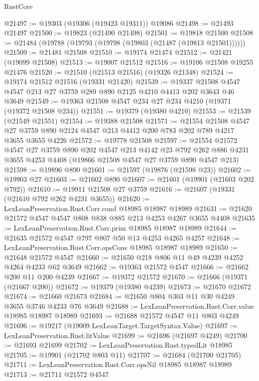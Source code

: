 \begin{lexlean}{RustCore}
\begin{coremodule}
@21497 := @19303 (@19306 (@19423 @19311)) @19086
@21498 := @21493 @21497
@21500 := @19823 (@21490 @21498)
@21501 := @19818 @21500
@21508 := @21484 (@19788 (@19793 (@19798 (@19803 (@21487 (@19813 @21501))))))
@21509 := @21481 @21508
@21510 := @19174 @21474
@21512 := @21421 (@19099 @21508)
@21513 := @19007 @21512
@21516 := @19106 @21508 @19255 @21476
@21520 := @21510 (@21513 @21516) (@19326 @21348)
@21524 := @19174 @21512 @21516 (@19331 @21420)
@21539 := @19337 @21508 @4547 @4547 @213 @27 @3759 @289 @890 @2125 @4210 @4413 @202 @3643 @46 @3649
@21549 := @19363 @21508 @4547 @234 @27 @234 @4210 (@19371 (@19372 @21508 @234))
@21551 := @19379 (@19380 @4210)
@21553 := @21539 (@21549 @21551)
@21554 := @19388 @21508
@21571 := @21554
    @21508
    @4547
    @27
    @3759
    @890
    @2124
    @4547
    @213
    @4412
    @200
    @783
    @202
    @789
    @4217
    @3655
    @3655
    @4226
@21572 := @19778 @21508
@21597 := @21554
    @21572
    @4547
    @27
    @3759
    @890
    @202
    @4547
    @213
    @4142
    @23
    @792
    @262
    @886
    @4231
    @3655
    @4253
    @4408
    (@19866 @21508 @4547 @27 @3759 @890 @4547 @213)
@21598 := @19896 @890
@21601 := @21597 (@19876 (@21598 @23))
@21602 := @19903 @27
@21603 := @21602 @890
@21607 := @21601 (@19901 (@21603 @202 @792))
@21610 := @19911 @21508 @27 @3759
@21616 := @21607 (@19331 (@21610 @792 @262 @4231 @3655))
@21620 := LexLeanPreservation.Rust.Corr.cond @18985 @18987 @18989
@21631 := @21620 @21572 @4547 @4547 @808 @838 @885 @213 @4253 @4267 @3655 @4408
@21635 := LexLeanPreservation.Rust.Corr.prim @18985 @18987 @18989
@21644 := @21635 @21572 @4547 @797 @807 @50 @13 @4253 @4265 @4257
@21648 := LexLeanPreservation.Rust.Corr.opsCons @18985 @18987 @18989
@21650 := @21648 @21572 @4547
@21660 := @21650 @218 @806 @11 @49 @4239 @4252 @4264 @4233 @62 @3649
@21662 := @19363 @21572 @4547
@21666 := @21662 @200 @11 @200 @4239
@21667 := @19372 @21572
@21670 := @21666 (@19371 (@21667 @200))
@21672 := @19379 (@19380 @4239)
@21673 := @21670 @21672
@21674 := @21660 @21673
@21684 := @21650 @804 @303 @11 @30 @4249 @3655 @3746 @4233 @76 @3649
@21688 := LexLeanPreservation.Rust.Corr.value @18985 @18987 @18989
@21693 := @21688 @21572 @4547 @11 @803 @4249
@21696 := @19217 (@19009 LexLeanTarget.TargetSyntax.Value)
@21697 := LexLeanPreservation.Rust.litValue
@21699 := @21696 (@21697 @4249)
@21700 := @21693 @21699
@21702 := LexLeanPreservation.Rust.typedLit @18985
@21705 := @19901 (@21702 @803 @11)
@21707 := @21684 (@21700 @21705)
@21711 := LexLeanPreservation.Rust.Corr.opsNil @18985 @18987 @18989
@21713 := @21711 @21572 @4547

\end{coremodule}
\end{lexlean}
